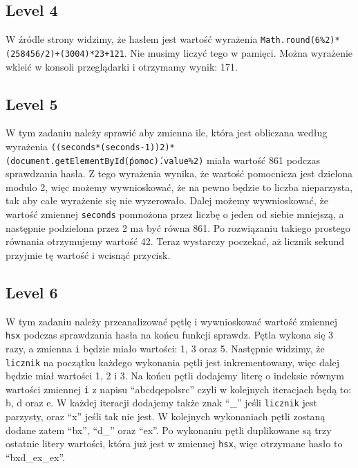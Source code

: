 \documentclass[11pt]{article}
\begin{document}
\subsection{Level 4}

W źródle strony widzimy, że hasłem jest wartość wyrażenia \newline \texttt{Math.round(6\%2)*(258456/2)+(300\/4)*2\/3+121}. \newline Nie musimy liczyć tego w pamięci. Można wyrażenie wkleić w konsoli przeglądarki i otrzymamy wynik: 171.

\subsection{Level 5}

W tym zadaniu należy sprawić aby zmienna ile, która jest obliczana według wyrażenia \newline \texttt{((seconds*(seconds-1))\/2)*(document.getElementById(\'pomoc\').value\%2)} \newline miała wartość 861 podczas sprawdzania hasła. Z tego wyrażenia wynika, że wartość pomocnicza jest dzielona modulo 2, więc możemy wywnioskować, że na pewno będzie to liczba nieparzysta, tak aby całe wyrażenie się nie wyzerowało. Dalej możemy wywnioskować, że wartość zmiennej \texttt{seconds} pomnożona przez liczbę o jeden od siebie mniejszą, a następnie podzielona przez 2 ma być równa 861. Po rozwiązaniu takiego prostego równania otrzymujemy wartość 42. Teraz wystarczy poczekać, aż licznik sekund przyjmie tę wartość i wcisnąć przycisk.

\subsection{Level 6}

W tym zadaniu należy przeanalizować pętlę i wywnioskować wartość zmiennej \texttt{hsx} podczas sprawdzania hasła na końcu funkcji sprawdz. Pętla wykona się 3 razy, a zmienna \texttt{i} będzie miało wartości: 1, 3 oraz 5. Następnie widzimy, że \texttt{licznik} na początku każdego wykonania pętli jest inkrementowany, więc dalej będzie miał wartości 1, 2 i 3. Na końcu pętli dodajemy literę o indeksie równym wartości zmiennej \texttt{i} z napisu ``abcdqepolsrc'' czyli w kolejnych iteracjach będą to: b, d oraz e. W każdej iteracji dodajemy także znak ``\_'' jeśli \texttt{licznik} jest parzysty, oraz ``x'' jeśli tak nie jest. W kolejnych wykonaniach pętli zostaną dodane zatem ``bx'', ``d\_'' oraz ``ex''. Po wykonaniu pętli duplikowane są trzy ostatnie litery wartości, która już jest w zmiennej \texttt{hsx}, więc otrzymane hasło to ``bxd\_ex\_ex''.
\end{document}
